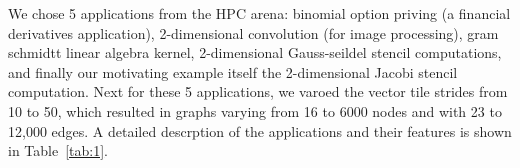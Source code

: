 We chose 5 applications from the HPC arena: binomial option priving (a
financial derivatives application), 2-dimensional convolution (for image
processing), gram schmidtt linear algebra kernel, 2-dimensional
Gauss-seildel stencil computations, and finally our motivating example
itself the 2-dimensional Jacobi stencil computation. Next for these 5
applications, we varoed the vector tile strides from 10 to 50, which
resulted in graphs varying from 16 to 6000 nodes and with 23 to 12,000
edges. A detailed descrption of the applications and their features is
shown in Table~\ref{tab:1}.

\begin{figure}[t!]
  \centering
\end{figure}

